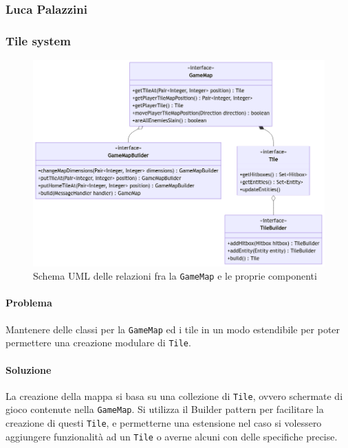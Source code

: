 \documentclass[a4paper,12pt]{report}
\begin{document}
\subsubsection{Luca Palazzini}
\subsubsection{Tile system}
\begin{figure}[H]
\centering{}
\includegraphics[width=1.0\columnwidth]{images/uml-map.png}
\caption{Schema UML delle relazioni fra la \texttt{GameMap} e le proprie componenti}
\label{img:uml-game-map}
\end{figure}
\paragraph{Problema} Mantenere delle classi per la \texttt{GameMap} ed i tile in un modo estendibile per poter permettere una creazione modulare di \texttt{Tile}.
\paragraph{Soluzione} La creazione della mappa si basa su una collezione di \texttt{Tile}, ovvero schermate di gioco contenute nella \texttt{GameMap}. 
%
Si utilizza il Builder pattern per facilitare la creazione di questi \texttt{Tile}, e permetterne una estensione nel caso si volessero aggiungere funzionalità ad un \texttt{Tile} o averne alcuni con delle specifiche precise.
\end{document}
